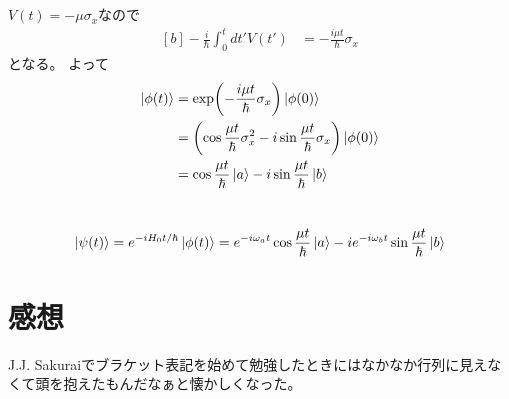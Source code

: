 \documentclass[../../master.tex]{subfiles}
\begin{document}
\section{}
\(V(t)=-\mu\sigma_x\)なので
\begin{equation}\begin{aligned}[b]
    -\frac{i}{\hbar}\int_{0}^{t}dt' V(t') &= -\frac{i\mu t}{\hbar}\sigma_x
\end{aligned}\end{equation}
となる。
よって
\begin{equation}\begin{aligned}[b]
    \ket{\phi(t)}
    &= \exp(-\frac{i\mu t}{\hbar}\sigma_x) \ket{\phi(0)}\\
    &= \qty(\cos\frac{\mu t}{\hbar}\sigma_x^2 - i\sin\frac{\mu t}{\hbar}\sigma_x)\ket{\phi(0)}\\
    &= \cos\frac{\mu t}{\hbar}\ket{a} - i\sin\frac{\mu t}{\hbar}\ket{b}
\end{aligned}\end{equation}

\section{}
\begin{equation}\begin{aligned}[b]
    \ket{\psi(t)} = e^{-iH_0t/\hbar}\ket{\phi(t)}=e^{-i\omega_a t}\cos\frac{\mu t}{\hbar}\ket{a} - ie^{-i\omega_b t}\sin\frac{\mu t}{\hbar}\ket{b}
\end{aligned}\end{equation}

\section*{感想}
J.J. Sakuraiでブラケット表記を始めて勉強したときにはなかなか行列に見えなくて頭を抱えたもんだなぁと懐かしくなった。
\end{document}
